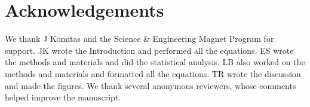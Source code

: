 \documentclass[reprint,amsmath,amssymb,aps,twoside]{revtex4-2} %
\begin{document}
    
\section{Acknowledgements}
We thank J Komitas and the Science \& Engineering Magnet Program for support. JK wrote the Introduction and performed all the equations. ES wrote the methods and materials and did the statistical analysis. LB also worked on the methods and materials and formatted all the equations. TR wrote the discussion and made the figures. We thank several anonymous reviewers, whose comments helped improve the manuscript. 









\end{document}
